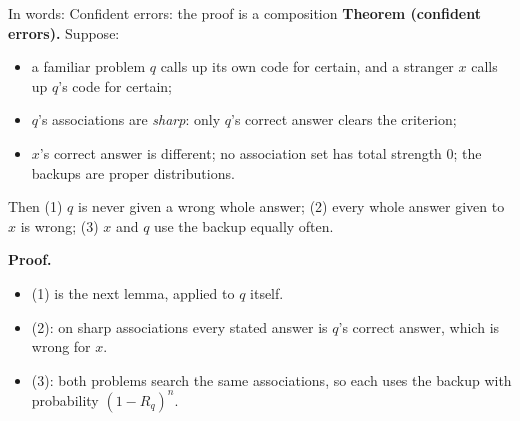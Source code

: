 \documentclass[aspectratio=169,11pt]{beamer}
\begin{document}
\begin{frame}{In words: Confident errors: the proof is a composition}
  \textbf{Theorem (confident errors).} Suppose:
  \begin{itemize}\small
    \item a familiar problem $q$ calls up its own code for certain, and a stranger $x$ calls up $q$'s code for certain;
    \item $q$'s associations are \emph{sharp}: only $q$'s correct answer clears the criterion;
    \item $x$'s correct answer is different; no association set has total strength 0; the backups are proper distributions.
  \end{itemize}
  Then (1) $q$ is never given a wrong whole answer; (2) every whole answer given to $x$ is wrong; (3) $x$ and $q$ use the backup equally often.
  \medskip

  \textbf{Proof.}
  \begin{itemize}\small
    \item (1) is the next lemma, applied to $q$ itself.
    \item (2): on sharp associations every stated answer is $q$'s correct answer, which is wrong for $x$.
    \item (3): both problems search the same associations, so each uses the backup with probability $(1-R_q)^n$.
  \end{itemize}
\end{frame}
\end{document}
